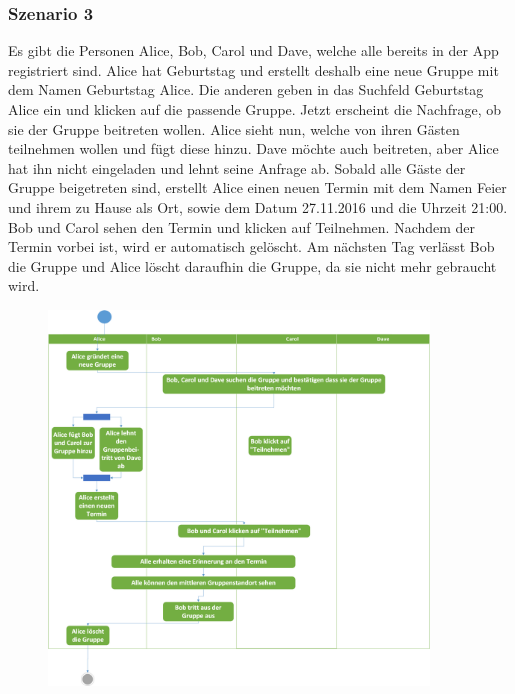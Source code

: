 \documentclass{scrartcl}
\begin{document}
	\subsubsection{Szenario 3}
	Es gibt die Personen Alice, Bob, Carol und Dave, welche alle bereits in der App registriert sind.
	Alice hat Geburtstag und erstellt deshalb eine neue Gruppe mit dem Namen \glqq{}Geburtstag Alice\grqq{}. Die anderen geben in das Suchfeld \glqq{}Geburtstag Alice\grqq{} ein und klicken auf die passende Gruppe.
	Jetzt erscheint die Nachfrage, ob sie der Gruppe beitreten wollen. Alice sieht nun, welche von ihren Gästen teilnehmen wollen und fügt diese hinzu. Dave möchte auch beitreten, aber Alice hat ihn nicht eingeladen und lehnt seine Anfrage ab.
	Sobald alle Gäste der Gruppe beigetreten sind, erstellt Alice einen neuen Termin mit dem Namen \glqq{}Feier\grqq{} und ihrem zu Hause als Ort, sowie dem Datum \glqq{}27.11.2016\grqq{} und die Uhrzeit \glqq{}21:00\grqq{}.
	Bob und Carol sehen den Termin und klicken auf \glqq{}Teilnehmen\grqq{}.
	Nachdem der Termin vorbei ist, wird er automatisch gelöscht.
	Am nächsten Tag verlässt Bob die Gruppe und Alice löscht daraufhin die Gruppe, da sie nicht mehr gebraucht wird.	
	\newline
	\newline
	\begin{figure}[h]
		\centering
		\includegraphics[width=0.9\textwidth]{Szenario3}
	\end{figure}
	\newpage
	
\end{document}
